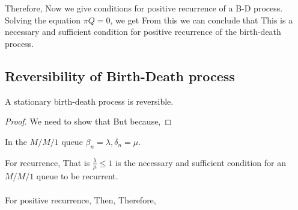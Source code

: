 \documentclass[all-lectures.tex]{subfiles}
\begin{document}
Therefore,
Now we give conditions for positive recurrence of a B-D process.
Solving the equation $\pi Q = 0$, we get
From this we can conclude that
This is a necessary and sufficient condition for positive recurrence of the birth-death process.

\subsection{Reversibility of Birth-Death process}
\begin{prop}
A stationary birth-death process is reversible.
\end{prop}

\begin{proof}
We need to show that 
But
because, 
\end{proof}
\begin{exmp}
In the $M/M/1$ queue $\beta_n = \lambda, \delta_n = \mu$.

For recurrence,
That is $\frac{\lambda}{\mu}  \le 1$ is the necessary and sufficient condition for an $M/M/1$ queue to be recurrent.\\\\
For positive recurrence,
Then,
Therefore,
\end{exmp}
\end{document}
